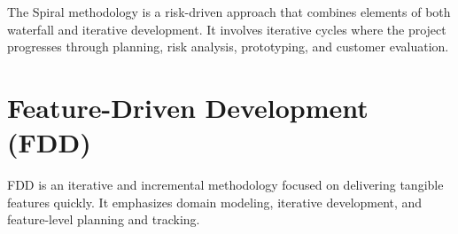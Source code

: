 The Spiral methodology is a risk-driven approach that combines elements of both waterfall and iterative development. It involves iterative cycles where the project progresses through planning, risk analysis, prototyping, and customer evaluation.

\section{Feature-Driven Development (FDD)}

FDD is an iterative and incremental methodology focused on delivering tangible features quickly. It emphasizes domain modeling, iterative development, and feature-level planning and tracking.
